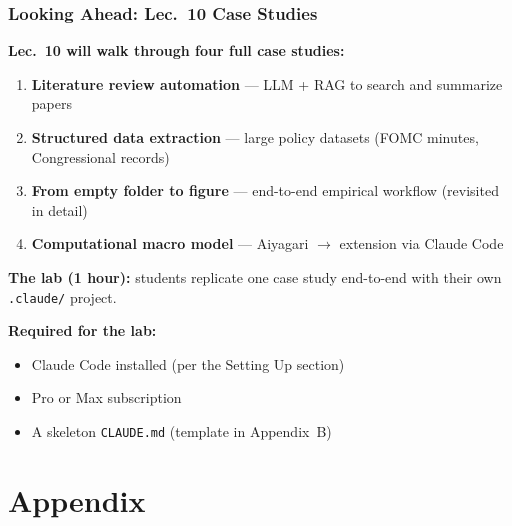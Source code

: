 \documentclass[10pt,english,aspectratio=169]{beamer}
\begin{document}
\begin{frame}
\frametitle{Looking Ahead: Lec.~10 Case Studies}

\textbf{Lec.~10 will walk through four full case studies:}

\vspace{0.2cm}

\begin{enumerate}
    \item \textbf{Literature review automation} --- LLM + RAG to search and summarize papers
    \item \textbf{Structured data extraction} --- large policy datasets (FOMC minutes, Congressional records)
    \item \textbf{From empty folder to figure} --- end-to-end empirical workflow (revisited in detail)
    \item \textbf{Computational macro model} --- Aiyagari $\to$ extension via Claude Code
\end{enumerate}

\vspace{0.3cm}

\textbf{The lab (1 hour):} students replicate one case study end-to-end with their own \texttt{.claude/} project.

\vspace{0.3cm}

\textbf{Required for the lab:}
\begin{itemize}
    \item Claude Code installed (per the Setting Up section)
    \item Pro or Max subscription
    \item A skeleton \texttt{CLAUDE.md} (template in Appendix~B)
\end{itemize}
\end{frame}

\section{Appendix}
\end{document}

